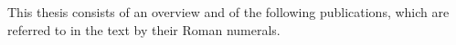 
This thesis consists of an overview and of the following publications, which
are referred to in the text by their Roman numerals.

\begin{description}[style=nextline, leftmargin=2.5em]
  \renewcommand{\Publication}[5]{\item[#1] #2. #3. \textit{#4}.}
  
\end{description}
